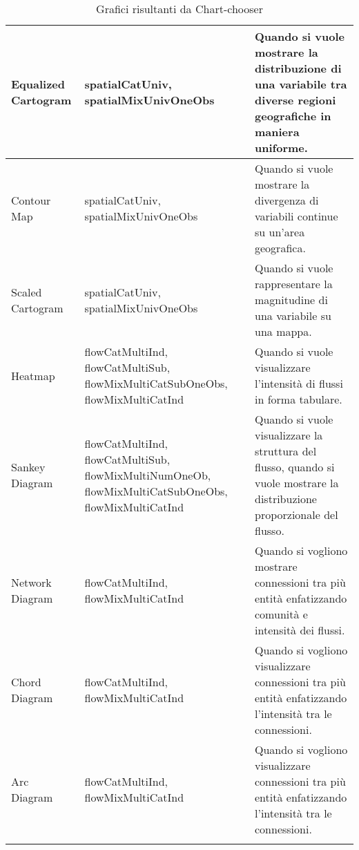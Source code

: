 \begin{xltabular}{0.98\columnwidth}{|p{0.2\columnwidth}|X|X|}
    \hline
    Equalized Cartogram & spatialCatUniv, spatialMixUnivOneObs & Quando si vuole mostrare la distribuzione di una variabile tra diverse regioni geografiche in maniera uniforme. \\
    \hline
    Contour Map & spatialCatUniv, spatialMixUnivOneObs & Quando si vuole mostrare la divergenza di variabili continue su un'area geografica. \\
    \hline
    Scaled Cartogram & spatialCatUniv, spatialMixUnivOneObs & Quando si vuole rappresentare la magnitudine di una variabile su una mappa. \\
    \hline
    Heatmap & flowCatMultiInd, flowCatMultiSub, flowMixMultiCatSubOneObs, flowMixMultiCatInd & Quando si vuole visualizzare l'intensità di flussi in forma tabulare. \\
    \hline
    Sankey Diagram & flowCatMultiInd, flowCatMultiSub, flowMixMultiNumOneOb, flowMixMultiCatSubOneObs, flowMixMultiCatInd & Quando si vuole visualizzare la struttura del flusso, quando si vuole mostrare la distribuzione proporzionale del flusso. \\
    \hline
    Network Diagram & flowCatMultiInd, flowMixMultiCatInd & Quando si vogliono mostrare connessioni tra più entità enfatizzando comunità e intensità dei flussi. \\
    \hline
    Chord Diagram & flowCatMultiInd, flowMixMultiCatInd & Quando si vogliono visualizzare connessioni tra più entità enfatizzando l'intensità tra le connessioni. \\
    \hline
    Arc Diagram & flowCatMultiInd, flowMixMultiCatInd & Quando si vogliono visualizzare connessioni tra più entità enfatizzando l'intensità tra le connessioni. \\
    \hline
    \caption{Grafici risultanti da Chart-chooser}
    \label{tab:grafici_chart_chooser}
\end{xltabular}




